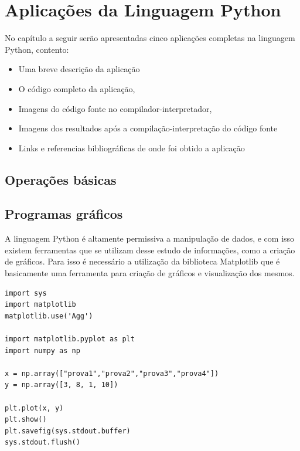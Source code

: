 


\chapter{ Aplica\c{c}\~{o}es da Linguagem Python}

No capítulo a seguir serão apresentadas cinco aplica\c{c}\~{o}es completas na linguagem Python, contento:
\begin{itemize}
  \item Uma breve descri\c{c}\~{a}o da aplica\c{c}\~{a}o
  \item O c\'{o}digo completo da aplica\c{c}\~{a}o,
  \item Imagens do c\'{o}digo fonte no compilador-interpretador,
  \item Imagens dos resultados ap\'{o}s a compila\c{c}\~{a}o-interpreta\c{c}\~{a}o do c\'{o}digo fonte
  \item Links e referencias bibliogr\'{a}ficas de onde foi obtido a aplica\c{c}\~{a}o
\end{itemize}




    \section{Opera\c{c}\~{o}es b\'{a}sicas}


    \section{Programas gr\'{a}ficos}
A linguagem Python é altamente permissiva a manipulação de dados, e com isso existem ferramentas que se utilizam desse estudo de informações, como a criação de gráficos. Para isso é necessário a utilização da biblioteca Matplotlib que é basicamente uma ferramenta para criação de gráficos e visualização dos mesmos.

\begin{lstlisting}
import sys
import matplotlib
matplotlib.use('Agg')

import matplotlib.pyplot as plt
import numpy as np

x = np.array(["prova1","prova2","prova3","prova4"])
y = np.array([3, 8, 1, 10])

plt.plot(x, y)
plt.show()
plt.savefig(sys.stdout.buffer)
sys.stdout.flush()

	
\end{lstlisting}
  

